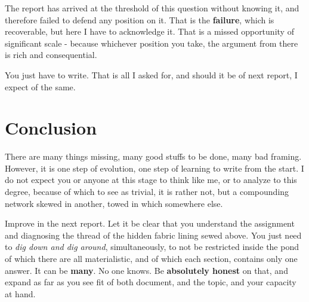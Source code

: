 \documentclass[10pt,a4paper]{article}
\begin{document}
The report has arrived at the threshold of this question without knowing it, and therefore failed to defend any position on it. That is the \textbf{failure}, which is recoverable, but here I have to acknowledge it. That is a missed opportunity of significant scale - because whichever position you take, the argument from there is rich and consequential.

You just have to write. That is all I asked for, and should it be of next report, I expect of the same. 

\section{Conclusion}

There are many things missing, many good stuffs to be done, many bad framing. However, it is one step of evolution, one step of learning to write from the start. I do not expect you or anyone at this stage to think like me, or to analyze to this degree, because of which to see as trivial, it is rather not, but a compounding network skewed in another, towed in which somewhere else. 

Improve in the next report. Let it be clear that you understand the assignment and diagnosing the thread of the hidden fabric lining sewed above. You just need to \textit{dig down and dig around}, simultaneously, to not be restricted inside the pond of which there are all materialistic, and of which each section, contains only one answer. It can be \textbf{many}. No one knows. Be \textbf{absolutely honest} on that, and expand as far as you see fit of both document, and the topic, and your capacity at hand. 



\end{document}
